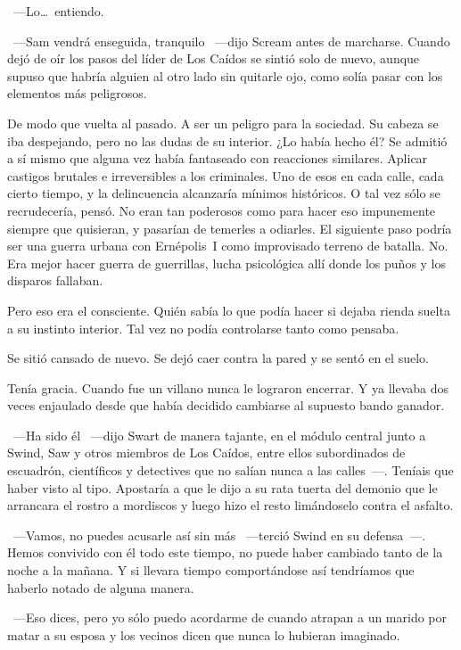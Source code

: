~---Lo\dots\ entiendo.

~---Sam vendrá enseguida, tranquilo ~---dijo Scream antes de marcharse. Cuando dejó de oír los pasos del líder de Los Caídos se sintió solo de nuevo, aunque supuso que habría alguien al otro lado sin quitarle ojo, como solía pasar con los elementos más peligrosos.

De modo que vuelta al pasado. A ser un peligro para la sociedad. Su cabeza se iba despejando, pero no las dudas de su interior. ¿Lo había hecho él? Se admitió a sí mismo que alguna vez había fantaseado con reacciones similares. Aplicar castigos brutales e irreversibles a los criminales. Uno de esos en cada calle, cada cierto tiempo, y la delincuencia alcanzaría mínimos históricos. O tal vez sólo se recrudecería, pensó. No eran tan poderosos como para hacer eso impunemente siempre que quisieran, y pasarían de temerles a odiarles. El siguiente paso podría ser una guerra urbana con Ernépolis~I como improvisado terreno de batalla. No. Era mejor hacer guerra de guerrillas, lucha psicológica allí donde los puños y los disparos fallaban.

Pero eso era el consciente. Quién sabía lo que podía hacer si dejaba rienda suelta a su instinto interior. Tal vez no podía controlarse tanto como pensaba.

Se sitió cansado de nuevo. Se dejó caer contra la pared y se sentó en el suelo.

Tenía gracia. Cuando fue un villano nunca le lograron encerrar. Y ya llevaba dos veces enjaulado desde que había decidido cambiarse al supuesto bando ganador.

\parbreak
~---Ha sido él ~---dijo Swart de manera tajante, en el módulo central junto a Swind, Saw y otros miembros de Los Caídos, entre ellos subordinados de escuadrón, científicos y detectives que no salían nunca a las calles~---. Teníais que haber visto al tipo. Apostaría a que le dijo a su rata tuerta del demonio que le arrancara el rostro a mordiscos y luego hizo el resto limándoselo contra el asfalto.

~---Vamos, no puedes acusarle así sin más ~---terció Swind en su defensa~---. Hemos convivido con él todo este tiempo, no puede haber cambiado tanto de la noche a la mañana. Y si llevara tiempo comportándose así tendríamos que haberlo notado de alguna manera.

~---Eso dices, pero yo sólo puedo acordarme de cuando atrapan a un marido por matar a su esposa y los vecinos dicen que nunca lo hubieran imaginado.

